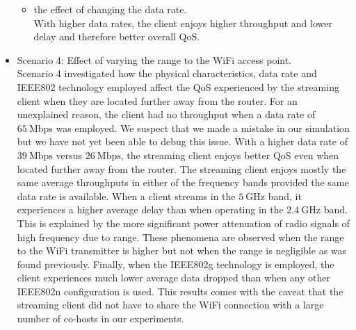 \begin{itemize}
\begin{itemize}
		\item the effect of changing the data rate.\\
		With higher data rates, the client enjoys higher throughput and lower delay and therefore better overall \gls{QoS}.
	\end{itemize}
	\item Scenario 4: Effect of varying the range to the \gls{WiFi} access point. \\
	Scenario 4 investigated how the physical characteristics, data rate and \gls{IEEE802} technology employed affect the \gls{QoS} experienced by the streaming client when they are located further away from the router. For an unexplained reason, the client had no throughput when a data rate of $65~\mathrm{Mbps}$ was employed. We suspect that we made a mistake in our simulation but we have not yet been able to debug this issue. With a higher data rate of $39~\mathrm{Mbps}$ versus $26~\mathrm{Mbps}$, the streaming client enjoys better \gls{QoS} even when located further away from the router. The streaming client enjoys mostly the same average throughputs in either of the frequency bands provided the same data rate is available. When a client streams in the $5~\mathrm{GHz}$ band, it experiences a higher average delay than when operating in the $2.4~\mathrm{GHz}$ band. This is explained by the more significant power attenuation of radio signals of high frequency due to range. These phenomena are observed when the range to the \gls{WiFi} transmitter is higher but not when the range is negligible as was found previously. Finally, when the \gls{IEEE802}g technology is employed, the client experiences much lower average data dropped than when any other \gls{IEEE802}n configuration is used. This results comes with the caveat that the streaming client did not have to share the \gls{WiFi} connection with a large number of co-hosts in our experiments.
	
\end{itemize}

